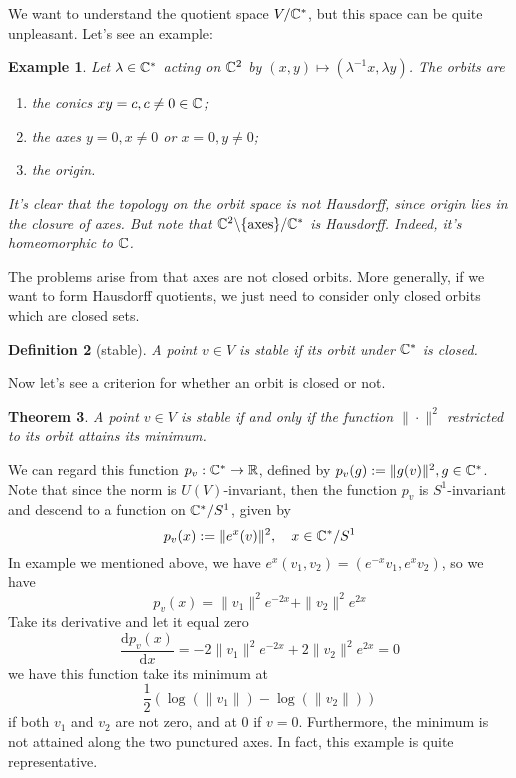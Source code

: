\documentclass[11pt]{amsart}
\numberwithin{equation}{section}
\theoremstyle{plain}
\theoremstyle{plain}
\newtheorem{thmsub}{Theorem}[subsection]
\newtheorem{defnsub}[thmsub]{Definition}
\newtheorem{exsub}[thmsub]{Example}
\numberwithin{equation}{section}
\begin{document}
We want to understand the quotient space $V/\Bbb{C}^*$, but this space can be quite unpleasant. Let's see an example:
\begin{exsub}\normalfont
Let $\lambda\in\Bbb{C}^*$ acting on $\Bbb{C}^2$ by $(x,y)\mapsto(\lambda^{-1}x,\lambda y)$. The orbits are 
\begin{enumerate}[$1.$]
\item the conics $xy=c,c\neq0\in\Bbb{C}$;
\item the axes $y=0,x\neq 0$ or $x=0,y\neq0$;
\item the origin.
\end{enumerate}
It's clear that the topology on the orbit space is not Hausdorff, since origin lies in the closure of axes. But note that $\Bbb{C}^2\backslash\{\text{axes}\}/\Bbb{C}^*$ is Hausdorff. Indeed, it's homeomorphic to $\Bbb{C}$. 
\end{exsub}
The problems arise from that axes are not closed orbits. More generally, if we want to form Hausdorff quotients, we just need to consider only closed orbits which are closed sets.
\begin{defnsub}[stable]
A point $v\in V$ is stable if its orbit under $\Bbb{C}^*$ is closed.
\end{defnsub}
Now let's see a criterion for whether an orbit is closed or not. 
\begin{thmsub}
A point $v\in V$ is stable if and only if the function $\|\cdot\|^2$ restricted to its orbit attains its minimum.
\end{thmsub}
We can regard this function $p_v:\Bbb{C}^*\to\Bbb{R}$, defined by $p_v(g):=\|g(v)\|^2,g\in\Bbb{C}^*$. Note that since the norm is $U(V)$-invariant, then the function $p_v$ is $S^1$-invariant and descend to a function on $\Bbb{C}^*/S^1$, given by
$$
p_v(x):=\|e^x(v)\|^2,\quad x\in\Bbb{C}^*/S^1
$$
In example we mentioned above, we have $e^x(v_1,v_2)=(e^{-x}v_1,e^{x}v_2)$, so we have
$$
p_v(x)=\|v_1\|^2e^{-2x}+\|v_2\|^2e^{2x}
$$
Take its derivative and let it equal zero
$$
\frac{\mathrm{d}p_v(x)}{\mathrm{d}x}=-2\|v_1\|^2e^{-2x}+2\|v_2\|^2e^{2x}=0
$$
we have this function take its minimum at 
$$
\frac12(\log(\|v_1\|)-\log(\|v_2\|))
$$
if both $v_1$ and $v_2$ are not zero, and at $0$ if $v=0$. Furthermore, the minimum is not attained along the two punctured axes. In fact, this example is quite representative.
\end{document}
